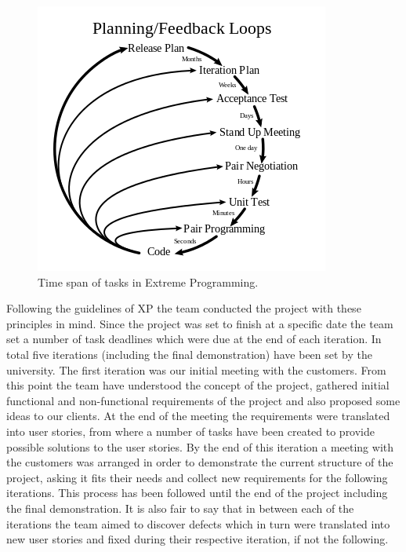 \documentclass{l3proj}
\begin{document}
\begin{figure}
\includegraphics[width=1.1\linewidth]{figures/Extreme_Programming}
\caption{Time span of tasks in Extreme Programming.}
\label{fig:extreme-programming}
\end{figure}

Following the guidelines of XP the team conducted the project with these principles in mind. Since the project was set to finish at a specific date the team set a number of task deadlines which were due at the end of each iteration. In total five iterations (including the final demonstration) have been set by the university. The first iteration was our initial meeting with the customers. From this point the team have understood the concept of the project, gathered initial functional and non-functional requirements of the project and also proposed some ideas to our clients. At the end of the meeting the requirements were translated into user stories, from where a number of tasks have been created to provide possible solutions to the user stories. By the end of this iteration a meeting with the customers was arranged in order to demonstrate the current structure of the project, asking it fits their needs and collect new requirements for the following iterations. This process has been followed until the end of the project including the final demonstration. It is also fair to say that in between each of the iterations the team aimed to discover defects which in turn were translated into new user stories and fixed during their respective iteration, if not the following.
\end{document}
